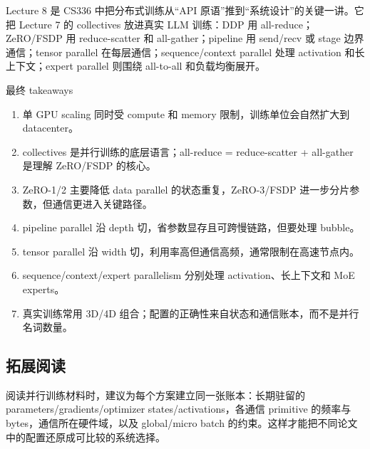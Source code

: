 \documentclass[a4paper]{article}
\begin{document}
Lecture 8 是 CS336 中把分布式训练从“API 原语”推到“系统设计”的关键一讲。它把 Lecture 7 的 collectives 放进真实 LLM 训练：DDP 用 all-reduce；ZeRO/FSDP 用 reduce-scatter 和 all-gather；pipeline 用 send/recv 或 stage 边界通信；tensor parallel 在每层通信；sequence/context parallel 处理 activation 和长上下文；expert parallel 则围绕 all-to-all 和负载均衡展开。

\begin{importantbox}{最终 takeaways}
\begin{enumerate}
    \item 单 GPU scaling 同时受 compute 和 memory 限制，训练单位会自然扩大到 datacenter。
    \item collectives 是并行训练的底层语言；all-reduce = reduce-scatter + all-gather 是理解 ZeRO/FSDP 的核心。
    \item ZeRO-1/2 主要降低 data parallel 的状态重复，ZeRO-3/FSDP 进一步分片参数，但通信更进入关键路径。
    \item pipeline parallel 沿 depth 切，省参数显存且可跨慢链路，但要处理 bubble。
    \item tensor parallel 沿 width 切，利用率高但通信高频，通常限制在高速节点内。
    \item sequence/context/expert parallelism 分别处理 activation、长上下文和 MoE experts。
    \item 真实训练常用 3D/4D 组合；配置的正确性来自状态和通信账本，而不是并行名词数量。
\end{enumerate}
\end{importantbox}

\subsection{拓展阅读}

阅读并行训练材料时，建议为每个方案建立同一张账本：长期驻留的 parameters/gradients/optimizer states/activations，各通信 primitive 的频率与 bytes，通信所在硬件域，以及 global/micro batch 的约束。这样才能把不同论文中的配置还原成可比较的系统选择。
\end{document}
